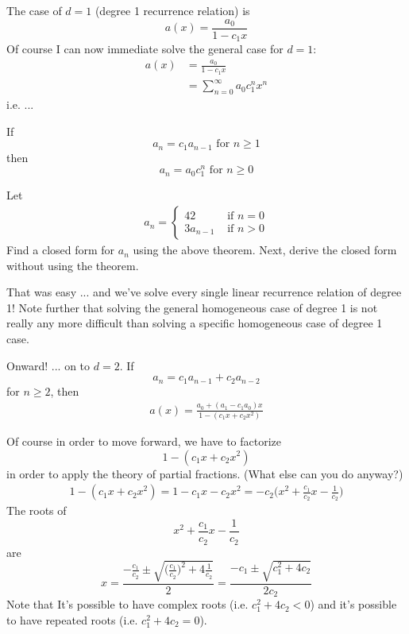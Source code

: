 The case of $d = 1$ (degree 1 recurrence relation) is
\[
a(x) = 
\frac
{a_0}
{1 - c_1x}
\]
Of course I can now immediate solve the general case for $d = 1$:
\begin{align*}
a(x) 
&= \frac{a_0}{1 - c_1x} \\
&= \sum_{n=0}^\infty a_0c_1^n x^n
\end{align*}
i.e. ...

\begin{thm}
If 
\[
a_n = c_1a_{n-1} \text{ for } n \geq 1
\]
then
\[
a_n = a_0 c_1^n \text{ for } n \geq 0
\]
\end{thm}



\newpage
\begin{ex}
Let 
\begin{align*}
a_n = 
\begin{cases}
42 & \text{ if } n = 0 \\
3a_{n-1} & \text{ if } n > 0
\end{cases}
\end{align*}
Find a closed form for $a_n$ using the above theorem.
Next, derive the closed form without using the theorem.
\end{ex}


\newpage
That was easy ...
and we've solve every single linear recurrence relation of degree 1!
Note further that solving the general homogeneous case of degree 1 
is not really 
any more difficult
than solving a specific homogeneous case of degree 1 case.

Onward! ... on to $d = 2$. If
\[
a_n = c_1 a_{n-1} + c_2 a_{n-2}
\]
for $n \geq 2$, then
\begin{align*}
a(x) 
= 
\frac
{a_0 + (a_1 - c_1 a_0) x}
{1 - (c_1 x + c_2 x^2)}
\end{align*}

Of course in order to move forward, we have to factorize
\[
1 - (c_1 x + c_2 x^2)
\]
in order to apply the theory of partial fractions.
(What else can you do anyway?)
\begin{align*}
1 - (c_1 x + c_2 x^2)
= 1 - c_1 x - c_2 x^2
= -c_2 \biggl( x^2 + \frac{c_1}{c_2} x - \frac{1}{c_2} \biggr)
\end{align*}
The roots of
\[
x^2 + \frac{c_1}{c_2} x - \frac{1}{c_2}
\]
are
\[
x = 
\frac
{-\frac{c_1}{c_2} 
\pm 
\sqrt{
\bigl( \frac{c_1}{c_2} \bigr)^2
+ 4 \frac{1}{c_2}
}
}
{2}
=
\frac{-c_1 \pm \sqrt{c_1^2 + 4c_2}}{2c_2}
\]
Note that 
It's possible to have complex roots (i.e. $c_1^2 + 4c_2 < 0$)
and it's possible to have repeated roots (i.e. $c_1^2 + 4c_2 = 0$).

